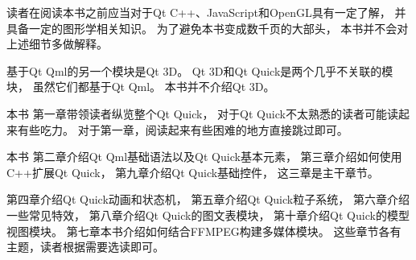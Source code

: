 读者在阅读本书之前应当对于Qt C++、JavaScript和OpenGL具有一定了解，
并具备一定的图形学相关知识。
为了避免本书变成数千页的大部头，
本书并不会对上述细节多做解释。

基于Qt Qml的另一个模块是Qt 3D。
Qt 3D和Qt Quick是两个几乎不关联的模块，
虽然它们都基于Qt Qml。
本书并不介绍Qt 3D。

本书
第一章带领读者纵览整个Qt Quick，
对于Qt Quick不太熟悉的读者可能读起来有些吃力。
对于第一章，阅读起来有些困难的地方直接跳过即可。

本书
第二章介绍Qt Qml基础语法以及Qt Quick基本元素，
第三章介绍如何使用C++扩展Qt Quick，
第九章介绍Qt Quick基础控件，
这三章是主干章节。

第四章介绍Qt Quick动画和状态机，
第五章介绍Qt Quick粒子系统，
第六章介绍一些常见特效，
第八章介绍Qt Quick的图文表模块，
第十章介绍Qt Quick的模型视图模块。
第七章本书介绍如何结合FFMPEG构建多媒体模块。
这些章节各有主题，读者根据需要选读即可。













